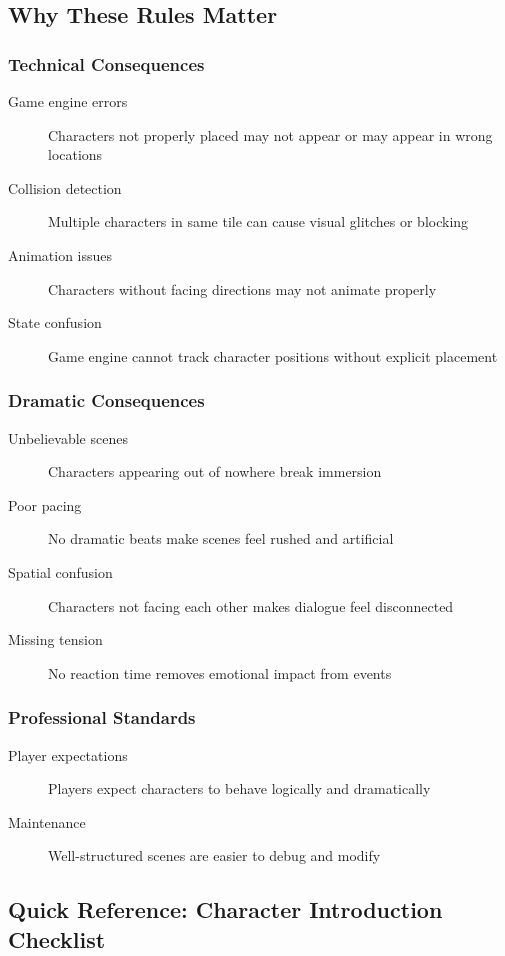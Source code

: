 \documentclass[11pt,letterpaper,oldstylefigures]{memoir}
\begin{document}
\subsection{Why These Rules Matter}

\subsubsection{Technical Consequences}
\begin{description}
\item[Game engine errors] Characters not properly placed may not appear or may appear in wrong locations
\item[Collision detection] Multiple characters in same tile can cause visual glitches or blocking
\item[Animation issues] Characters without facing directions may not animate properly
\item[State confusion] Game engine cannot track character positions without explicit placement
\end{description}

\subsubsection{Dramatic Consequences}
\begin{description}
\item[Unbelievable scenes] Characters appearing out of nowhere break immersion
\item[Poor pacing] No dramatic beats make scenes feel rushed and artificial
\item[Spatial confusion] Characters not facing each other makes dialogue feel disconnected
\item[Missing tension] No reaction time removes emotional impact from events
\end{description}

\subsubsection{Professional Standards}
\begin{description}
\item[Player expectations] Players expect characters to behave logically and dramatically
\item[Maintenance] Well-structured scenes are easier to debug and modify
\end{description}

\subsection{Quick Reference: Character Introduction Checklist}
\end{document}
